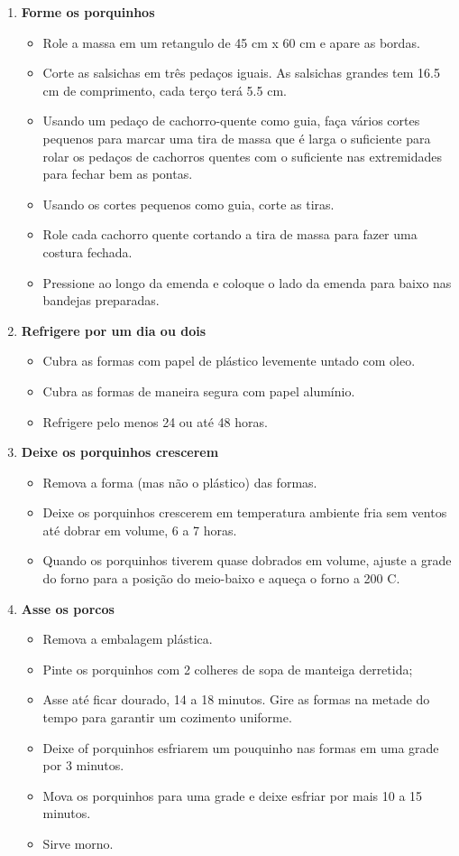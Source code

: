 \documentclass [11pt, papel de carta] {article}
\newcommand \fileName {PigsOnBlanket}
\begin{document}
\begin {description}
\begin {enumerate}
\item {\bf Forme os porquinhos}
\begin {itemize}
\item Role a massa em um retangulo de 45 cm x 60 cm e apare as bordas.
\item Corte as salsichas em tr\^es peda\c{c}os iguais. As salsichas grandes tem 16.5 cm de comprimento, cada ter\c{c}o ter\'a 5.5 cm.
\item Usando um peda\c{c}o de cachorro-quente como guia, fa\c{c}a v\'arios cortes pequenos para marcar uma tira de massa que \'e larga o suficiente para rolar os peda\c{c}os de cachorros quentes com o suficiente nas extremidades para fechar bem as pontas.
\item Usando os cortes pequenos como guia, corte as tiras.
\item Role cada cachorro quente cortando a tira de massa para fazer uma costura fechada.
\item Pressione ao longo da emenda e coloque o lado da emenda para baixo nas bandejas preparadas.
\end {itemize}

\item {\bf Refrigere por um dia ou dois}
\begin {itemize}
\item Cubra as formas com papel de plástico levemente untado com oleo.
\item Cubra as formas de maneira segura com papel alumínio.
\item Refrigere pelo menos 24 ou até 48 horas.
\end {itemize}

\item {\bf Deixe os porquinhos crescerem}
\begin {itemize}
\item Remova a forma (mas não o plástico) das formas.
\item Deixe os porquinhos crescerem em temperatura ambiente fria sem ventos
 até dobrar em volume, 6 a 7 horas.
\item Quando os porquinhos tiverem quase dobrados em volume,
ajuste a grade do forno para a posição do meio-baixo e aqueça o forno a 200 C.
\end {itemize}

\item {\bf Asse os porcos}
\begin {itemize}
\item Remova a embalagem plástica.
\item Pinte os porquinhos com 2 colheres de sopa de manteiga derretida;
\item Asse até ficar dourado, 14 a 18 minutos. Gire as formas na metade do tempo para garantir um cozimento uniforme.
\item Deixe of porquinhos esfriarem um pouquinho nas formas em uma grade por 3 minutos.
\item Mova os porquinhos para uma grade e deixe esfriar por mais 10 a 15 minutos.
\item Sirve morno.
\end {itemize}
\end {enumerate}
\end {description}


\end{document}
